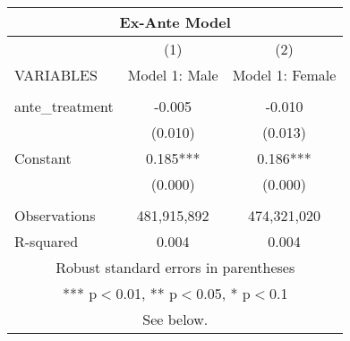 \begin{tabular}{lcc}
\multicolumn{3}{c}{Ex-Ante Model} \\ \hline
 & (1) & (2) \\
VARIABLES & Model 1: Male & Model 1: Female \\ \hline
 &  &  \\
ante\_treatment & -0.005 & -0.010 \\
 & (0.010) & (0.013) \\
Constant & 0.185*** & 0.186*** \\
 & (0.000) & (0.000) \\
 &  &  \\
Observations & 481,915,892 & 474,321,020 \\
 R-squared & 0.004 & 0.004 \\ \hline
\multicolumn{3}{c}{ Robust standard errors in parentheses} \\
\multicolumn{3}{c}{ *** p$<$0.01, ** p$<$0.05, * p$<$0.1} \\
\multicolumn{3}{c}{ See below.} \\
\end{tabular}
